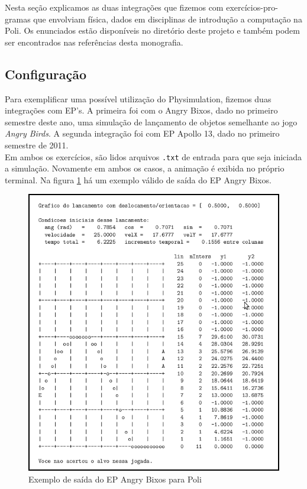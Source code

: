 Nesta seção explicamos as duas integrações que fizemos com exercícios-pro-\newline gramas que envolviam física, dados em disciplinas de introdução a computação na Poli. Os enunciados estão disponíveis no diretório deste projeto e também podem ser encontrados nas referências desta monografia.

\subsection{Configuração}

Para exemplificar uma possível utilização do Physimulation, fizemos duas integrações com EP's. A primeira foi com o Angry Bixos, dado no primeiro semestre deste ano, uma simulação de lançamento de objetos semelhante ao jogo \textit{Angry Birds}. A segunda integração foi com EP Apollo 13, dado no primeiro semestre de 2011. \\

Em ambos os exercícios, são lidos arquivos {\tt .txt} de entrada para que seja iniciada a simulação. Novamente em ambos os casos, a animação é exibida no próprio terminal. Na figura \ref{angry-bixos-oficial} há um exemplo válido de saída do EP Angry Bixos. \\

\begin{figure}[!htbp]
  \centering
	\includegraphics[scale=0.5]{images/angry-bixos-oficial-2.png}
	\caption{Exemplo de saída do EP Angry Bixos para Poli}
  \label{angry-bixos-oficial}
\end{figure}

